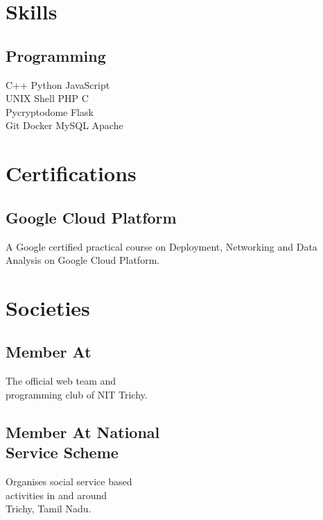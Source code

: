 \documentclass[]{deedy-resume-openfont}
\begin{document}
\begin{minipage}[t]{0.33\textwidth}
\section{Skills}
\subsection{Programming}
C++ \textbullet{} Python \textbullet{} JavaScript \\
UNIX Shell \textbullet{} PHP \textbullet{} C \\
Pycryptodome \textbullet{} Flask \\
Git \textbullet{} Docker \textbullet{} MySQL \textbullet{} Apache
\sectionsep


\section{Certifications}
\subsection{Google Cloud Platform}
A Google certified practical course on
Deployment, Networking and Data Analysis
on Google Cloud Platform.\newline
{}
\sectionsep


\section{Societies}
\subsection{Member At}
The official web team and \\
programming club of NIT Trichy.\newline
\subsection{Member At National \\
Service Scheme}
Organises social service based \\
activities in and around \\
Trichy, Tamil Nadu.
\sectionsep

%
%

\end{minipage} 
\end{document}

